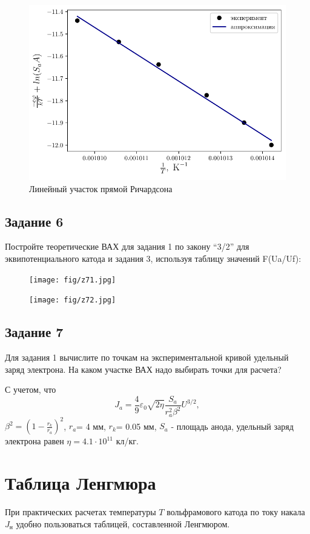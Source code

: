 \begin{figure}[H]
	\centering
	\includegraphics[width=0.75\linewidth]{scripts/richardson}
	\caption{Линейный участок прямой Ричардсона}
	\label{fig:richardson}
\end{figure}

\subsection{Задание 6}
 Постройте теоретические ВАХ для задания 1 по закону “3/2” для эквипотенциального катода и задания 3, используя таблицу значений F(Ua/Uf):
 \begin{figure}[H]
	\centering
	\texttt{[image: fig/z71.jpg]}
	\caption{}
	\label{fig:21}
\end{figure}

 \begin{figure}[H]
	\centering
	\texttt{[image: fig/z72.jpg]}
	\caption{}
	\label{fig:22}
\end{figure}
\subsection{Задание 7}
 Для задания 1 вычислите по точкам на экспериментальной кривой удельный заряд электрона. На каком участке ВАХ надо выбирать точки для расчета?

С учетом, что 
\begin{equation}
J_a=\frac49 \varepsilon_0 \sqrt{2 \eta} \frac{S_a}{r_a^2 \beta^2} U^{3/2}, 
\end{equation}
$\beta^2=(1-\frac{r_k}{r_a})^2$, $r_a$= 4 мм, $r_k$= 0.05 мм, $S_a$ - площадь анода, удельный заряд электрона равен $\eta=4.1 \cdot 10^{11}$ кл/кг.


\appendix

\section{Таблица Ленгмюра}%
\label{sub:tablitsa_lengmiura}
При практических расчетах температуры $T$ вольфрамового катода по току накала
$J_{\text{н}}$  удобно пользоваться таблицей, составленной Ленгмюром.

